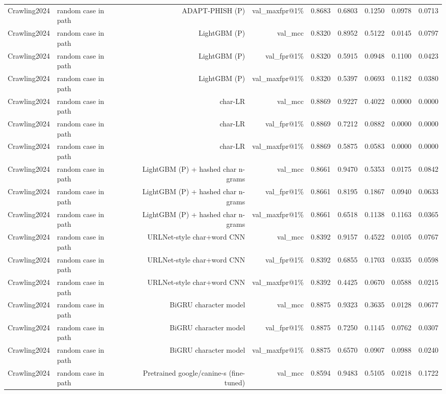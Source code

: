 \begin{table}[t]
\begin{tabular}{llrrrrrrr}
Crawling2024 & random case in path & ADAPT-PHISH (P) & val\_maxfpr@1\% & 0.8683 & 0.6803 & 0.1250 & 0.0978 & 0.0713 \\
Crawling2024 & random case in path & LightGBM (P) & val\_mcc & 0.8320 & 0.8952 & 0.5122 & 0.0145 & 0.0797 \\
Crawling2024 & random case in path & LightGBM (P) & val\_fpr@1\% & 0.8320 & 0.5915 & 0.0948 & 0.1100 & 0.0423 \\
Crawling2024 & random case in path & LightGBM (P) & val\_maxfpr@1\% & 0.8320 & 0.5397 & 0.0693 & 0.1182 & 0.0380 \\
Crawling2024 & random case in path & char-LR & val\_mcc & 0.8869 & 0.9227 & 0.4022 & 0.0000 & 0.0000 \\
Crawling2024 & random case in path & char-LR & val\_fpr@1\% & 0.8869 & 0.7212 & 0.0882 & 0.0000 & 0.0000 \\
Crawling2024 & random case in path & char-LR & val\_maxfpr@1\% & 0.8869 & 0.5875 & 0.0583 & 0.0000 & 0.0000 \\
Crawling2024 & random case in path & LightGBM (P) + hashed char n-grams & val\_mcc & 0.8661 & 0.9470 & 0.5353 & 0.0175 & 0.0842 \\
Crawling2024 & random case in path & LightGBM (P) + hashed char n-grams & val\_fpr@1\% & 0.8661 & 0.8195 & 0.1867 & 0.0940 & 0.0633 \\
Crawling2024 & random case in path & LightGBM (P) + hashed char n-grams & val\_maxfpr@1\% & 0.8661 & 0.6518 & 0.1138 & 0.1163 & 0.0365 \\
Crawling2024 & random case in path & URLNet-style char+word CNN & val\_mcc & 0.8392 & 0.9157 & 0.4522 & 0.0105 & 0.0767 \\
Crawling2024 & random case in path & URLNet-style char+word CNN & val\_fpr@1\% & 0.8392 & 0.6855 & 0.1703 & 0.0335 & 0.0598 \\
Crawling2024 & random case in path & URLNet-style char+word CNN & val\_maxfpr@1\% & 0.8392 & 0.4425 & 0.0670 & 0.0588 & 0.0215 \\
Crawling2024 & random case in path & BiGRU character model & val\_mcc & 0.8875 & 0.9323 & 0.3635 & 0.0128 & 0.0677 \\
Crawling2024 & random case in path & BiGRU character model & val\_fpr@1\% & 0.8875 & 0.7250 & 0.1145 & 0.0762 & 0.0307 \\
Crawling2024 & random case in path & BiGRU character model & val\_maxfpr@1\% & 0.8875 & 0.6570 & 0.0907 & 0.0988 & 0.0240 \\
Crawling2024 & random case in path & Pretrained google/canine-s (fine-tuned) & val\_mcc & 0.8594 & 0.9483 & 0.5105 & 0.0218 & 0.1722 \\

\end{tabular}
\end{table}
